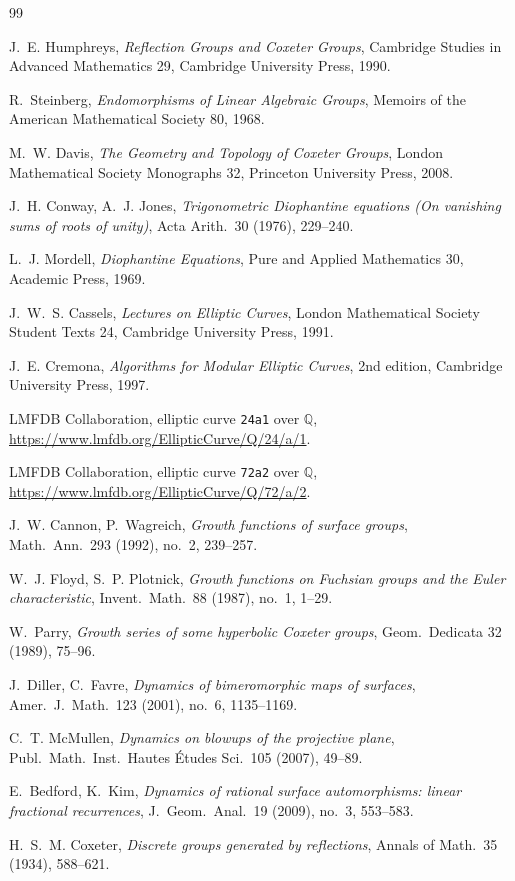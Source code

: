 \documentclass[11pt,a4paper]{article}
\theoremstyle{remark}
\theoremstyle{plain}
\begin{document}
\begin{thebibliography}{99}

J.~E. Humphreys, \emph{Reflection Groups and Coxeter Groups},
Cambridge Studies in Advanced Mathematics 29, Cambridge University
Press, 1990.

R.~Steinberg, \emph{Endomorphisms of Linear Algebraic Groups},
Memoirs of the American Mathematical Society 80, 1968.

M.~W. Davis, \emph{The Geometry and Topology of Coxeter Groups},
London Mathematical Society Monographs 32, Princeton University
Press, 2008.

J.~H. Conway, A.~J. Jones, \emph{Trigonometric Diophantine equations
(On vanishing sums of roots of unity)}, Acta Arith.\ 30 (1976),
229--240.

L.~J. Mordell, \emph{Diophantine Equations}, Pure and Applied
Mathematics 30, Academic Press, 1969.

J.~W.~S. Cassels, \emph{Lectures on Elliptic Curves}, London
Mathematical Society Student Texts 24, Cambridge University Press,
1991.

J.~E. Cremona, \emph{Algorithms for Modular Elliptic Curves},
2nd edition, Cambridge University Press, 1997.

LMFDB Collaboration, elliptic curve \texttt{24a1} over $\mathbb{Q}$,
\url{https://www.lmfdb.org/EllipticCurve/Q/24/a/1}.

LMFDB Collaboration, elliptic curve \texttt{72a2} over $\mathbb{Q}$,
\url{https://www.lmfdb.org/EllipticCurve/Q/72/a/2}.

J.~W. Cannon, P.~Wagreich, \emph{Growth functions of surface groups},
Math.\ Ann.\ 293 (1992), no.~2, 239--257.

W.~J. Floyd, S.~P. Plotnick, \emph{Growth functions on Fuchsian
groups and the Euler characteristic}, Invent.\ Math.\ 88 (1987),
no.~1, 1--29.

W.~Parry, \emph{Growth series of some hyperbolic Coxeter groups},
Geom.\ Dedicata 32 (1989), 75--96.

J.~Diller, C.~Favre, \emph{Dynamics of bimeromorphic maps of
surfaces}, Amer.\ J.\ Math.\ 123 (2001), no.~6, 1135--1169.

C.~T. McMullen, \emph{Dynamics on blowups of the projective plane},
Publ.\ Math.\ Inst.\ Hautes \'Etudes Sci.\ 105 (2007), 49--89.

E.~Bedford, K.~Kim, \emph{Dynamics of rational surface automorphisms:
linear fractional recurrences}, J.\ Geom.\ Anal.\ 19 (2009), no.~3,
553--583.

H.~S.~M. Coxeter, \emph{Discrete groups generated by reflections},
Annals of Math.\ 35 (1934), 588--621.

\end{thebibliography}
\end{document}
